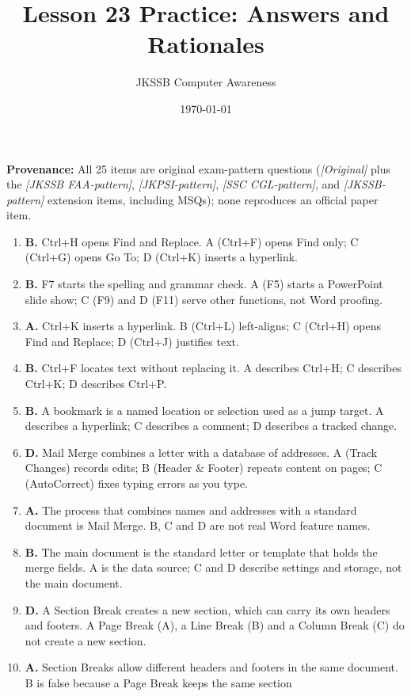 \documentclass[11pt]{article}
\title{Lesson 23 Practice: Answers and Rationales}
\author{JKSSB Computer Awareness}
\date{\today}
\begin{document}
\maketitle
\noindent\textbf{Provenance:} All 25 items are original exam-pattern questions (\textit{[Original]} plus the \textit{[JKSSB FAA-pattern]}, \textit{[JKPSI-pattern]}, \textit{[SSC CGL-pattern]}, and \textit{[JKSSB-pattern]} extension items, including MSQs); none reproduces an official paper item.

\begin{enumerate}[label=\textbf{Q\arabic*.}, leftmargin=*]
\item \textbf{B.} Ctrl+H opens Find and Replace. A (Ctrl+F) opens Find only;
  C (Ctrl+G) opens Go To; D (Ctrl+K) inserts a hyperlink.
\item \textbf{B.} F7 starts the spelling and grammar check. A (F5) starts a
  PowerPoint slide show; C (F9) and D (F11) serve other functions, not Word
  proofing.
\item \textbf{A.} Ctrl+K inserts a hyperlink. B (Ctrl+L) left-aligns; C
  (Ctrl+H) opens Find and Replace; D (Ctrl+J) justifies text.
\item \textbf{B.} Ctrl+F locates text without replacing it. A describes
  Ctrl+H; C describes Ctrl+K; D describes Ctrl+P.
\item \textbf{B.} A bookmark is a named location or selection used as a jump
  target. A describes a hyperlink; C describes a comment; D describes a
  tracked change.
\item \textbf{D.} Mail Merge combines a letter with a database of addresses.
  A (Track Changes) records edits; B (Header \& Footer) repeats content on
  pages; C (AutoCorrect) fixes typing errors as you type.
\item \textbf{A.} The process that combines names and addresses with a
  standard document is Mail Merge. B, C and D are not real Word feature names.
\item \textbf{B.} The main document is the standard letter or template that
  holds the merge fields. A is the data source; C and D describe settings and
  storage, not the main document.
\item \textbf{D.} A Section Break creates a new section, which can carry its
  own headers and footers. A Page Break (A), a Line Break (B) and a Column
  Break (C) do not create a new section.
\item \textbf{A.} Section Breaks allow different headers and footers in the
  same document. B is false because a Page Break keeps the same section

\end{enumerate}
\end{document}
